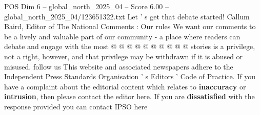 \begin{textsample}{POS Dim 6 – global\_north\_2025\_04 – Score 6.00 – global\_north\_2025\_04/123651322.txt}
Let ' s get that debate started!
Callum Baird, Editor of The National Comments : Our rules We want our comments to be a lively and valuable part of our community - a place where readers can debate and engage with the most @ @ @ @ @ @ @ @ @ @ stories is a privilege, not a right, however, and that privilege may be withdrawn if it is abused or misused. follow us This website and associated newspapers adhere to the Independent Press Standards Organisation ' s Editors ' Code of Practice.
If you have a complaint about the editorial content which relates to \textbf{inaccuracy} or \textbf{intrusion}, then please contact the editor here.
If you are \textbf{dissatisfied} with the response provided you can contact IPSO here

\end{textsample}
